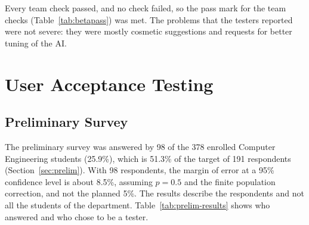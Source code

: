 Every team check passed, and no check failed, so the pass mark for the team checks (Table~\ref{tab:betapass}) was met. The problems that the testers reported were not severe: they were mostly cosmetic suggestions and requests for better tuning of the AI.


\section{User Acceptance Testing}
\label{sec:uat-results}
\subsection{Preliminary Survey}
\label{sec:prelim-results}
The preliminary survey was answered by 98 of the 378 enrolled Computer Engineering students (25.9\%), which is 51.3\% of the target of 191 respondents (Section~\ref{sec:prelim}). With 98 respondents, the margin of error at a 95\% confidence level is about 8.5\%, assuming $p=0.5$ and the finite population correction, and not the planned 5\%. The results describe the respondents and not all the students of the department. Table~\ref{tab:prelim-results} shows who answered and who chose to be a tester.

